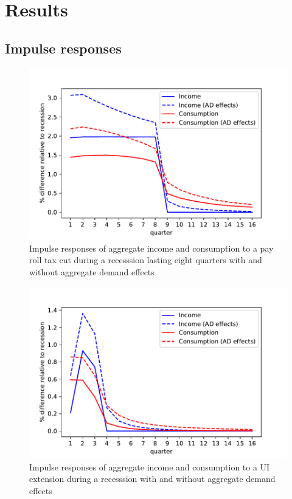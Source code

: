 \documentclass[../HAFiscal]{subfiles}
\begin{document}
\section{Results}



\subsection{Impulse responses}


\begin{figure}
	\centering
	\includegraphics[width=0.8\linewidth]{Code/HA-Models/FromPandemicCode/Figures/recession_taxcut_relrecession}
	\caption{Impulse responses of aggregate income and consumption to a pay roll tax cut during a recesssion lasting eight quarters with and without aggregate demand effects}
	\label{fig:recessiontaxcutrelrecession}
\end{figure}

\begin{figure}
	\centering
	\includegraphics[width=0.8\linewidth]{Code/HA-Models/FromPandemicCode/Figures/recession_UI_relrecession}
	\caption{Impulse responses of aggregate income and consumption to a UI extension during a recesssion with and without aggregate demand effects}
	\label{fig:recessionuirelrecession}
\end{figure}
\end{document}
